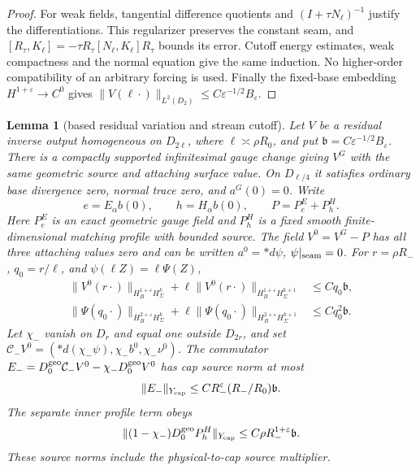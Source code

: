 \documentclass[11pt]{amsart}
\newtheorem{lemma}[theorem]{Lemma}
\theoremstyle{definition}
\theoremstyle{remark}
\theoremstyle{plain}
\begin{document}
\begin{proof}
For weak fields, tangential difference quotients and
$(I+\tau N_\ell)^{-1}$ justify the differentiations. This
regularizer preserves the constant seam, and
$[R_\tau,K_\ell]=-\tau R_\tau[N_\ell,K_\ell]R_\tau$
bounds its error. Cutoff energy estimates, weak compactness and the
normal equation give the same induction. No higher-order compatibility
of an arbitrary forcing is used. Finally the fixed-base embedding
$H^{1+\varepsilon}\to C^0$ gives
$\|V(\ell\cdot)\|_{L^2(D_2)}\leq
 C\varepsilon^{-1/2}B_\varepsilon$.
\end{proof}

\begin{lemma}[based residual variation and stream cutoff]
\label{lem:gluing-residual-cutoff}
Let $V$ be a residual inverse output homogeneous on $D_{2\ell}$,
where $\ell\asymp\rho R_0$, and put
$\mathfrak b=C\varepsilon^{-1/2}B_\varepsilon$.
There is a compactly supported infinitesimal gauge change giving
$V^G$ with the same geometric source and attaching surface value.
On $D_{\ell/4}$ it satisfies ordinary base divergence zero,
normal trace zero, and $a^G(0)=0$. Write
\[
 e=E_\alpha b(0),\qquad h=H_\alpha b(0),\qquad
 P=P^E_e+P^H_h.
\]
Here $P^E_e$ is an exact geometric gauge field and $P^H_h$ is
a fixed smooth finite-dimensional matching profile with bounded
source. The field $V^0=V^G-P$ has all three attaching values
zero and can be written $a^0=*d\psi$, $\psi|_{\rm seam}=0$.
For $r=\rho R_-$, $q_0=r/\ell$, and $\psi(\ell Z)=\ell\Psi(Z)$,
\begin{equation}\label{eq:gluing-residual-vanishing}
 \begin{split}
 \|V^0(r\cdot)\|_{H_B^{1+\varepsilon}H^k_\Sigma}
 +\ell\|V^0(r\cdot)\|_{H_B^{1+\varepsilon}H^{k+1}_\Sigma}
                                                   &\leq Cq_0\mathfrak b,\\
 \|\Psi(q_0\cdot)\|_{H_B^{2+\varepsilon}H^k_\Sigma}
 +\ell\|\Psi(q_0\cdot)\|_{H_B^{2+\varepsilon}H^{k+1}_\Sigma}
                                                   &\leq Cq_0^2\mathfrak b.
 \end{split}
\end{equation}
Let $\chi_-$ vanish on $D_r$ and equal one outside $D_{2r}$,
and set $\mathcal C_-V^0=(*d(\chi_-\psi),\chi_-b^0,\chi_-\nu^0)$.
The commutator
$E_-=D_0^{\rm geo}\mathcal C_-V^0-\chi_-D_0^{\rm geo}V^0$
has cap source norm at most
\begin{equation}\label{eq:gluing-residual-stream-error}
             \|E_-\|_{Y_{\rm cap}}
                      \leq CR_-^\varepsilon(R_-/R_0)\mathfrak b.
\end{equation}
The separate inner profile term obeys
\begin{equation}\label{eq:gluing-residual-profile-source}
       \|(1-\chi_-)D_0^{\rm geo}P^H_h\|_{Y_{\rm cap}}
                        \leq C\rho R_-^{1+\varepsilon}\mathfrak b.
\end{equation}
These source norms include the physical-to-cap source multiplier.
\end{lemma}
\end{document}
